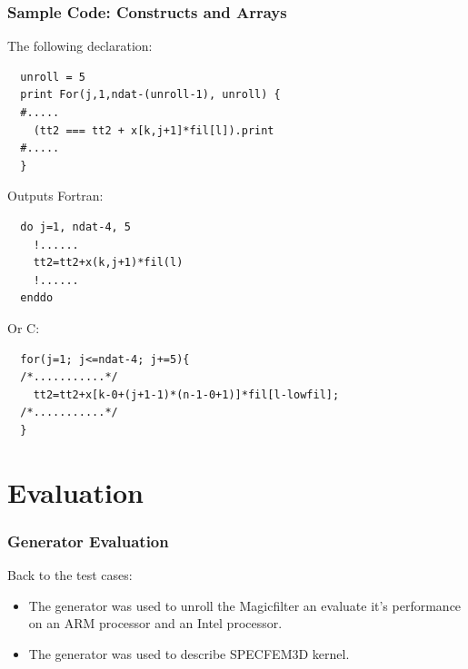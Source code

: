 \documentclass{beamer}
\begin{document}
\begin{frame}[fragile]
\frametitle{Sample Code: Constructs and Arrays}
The following declaration:
\tiny
{}
\begin{lstlisting}
  unroll = 5
  print For(j,1,ndat-(unroll-1), unroll) {
  #.....
    (tt2 === tt2 + x[k,j+1]*fil[l]).print
  #.....
  }
\end{lstlisting}
\normalsize 
Outputs Fortran:
\tiny
{}
\begin{lstlisting}
  do j=1, ndat-4, 5
    !......
    tt2=tt2+x(k,j+1)*fil(l)
    !......
  enddo
\end{lstlisting}
\normalsize
Or C:
\tiny
{}
\begin{lstlisting}
  for(j=1; j<=ndat-4; j+=5){
  /*...........*/
    tt2=tt2+x[k-0+(j+1-1)*(n-1-0+1)]*fil[l-lowfil];
  /*...........*/
  }
\end{lstlisting}
\end{frame}

\section{Evaluation}
\begin{frame}
\frametitle{Generator Evaluation}
Back to the test cases:
\begin{itemize}
\item The generator was used to unroll the Magicfilter an evaluate it's performance on an ARM processor and an Intel processor.
\item The generator was used to describe SPECFEM3D kernel.
\end{itemize}

\end{frame}
\end{document}
